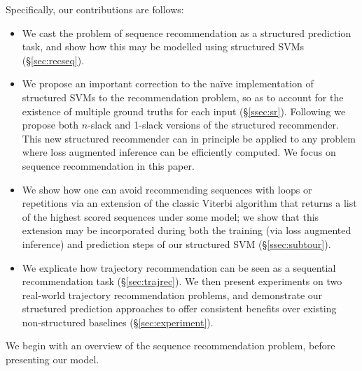 Specifically, our contributions are follows:
\begin{itemize}
	\item We cast the problem of sequence recommendation as a structured prediction task, and show how this may be modelled using structured SVMs (\S\ref{sec:recseq}).

	\item We propose an important correction to the na\"{i}ve implementation of structured SVMs to the recommendation problem, so as to account for the existence of multiple ground truths for each input (\S\ref{ssec:sr}). Following \citet{joachims2009cutting} we propose both $n$-slack and 1-slack versions of the structured recommender. This new structured recommender can in principle be applied to any problem where loss augmented inference can be efficiently computed. We focus on sequence recommendation in this paper.

	\item We show how one can avoid recommending sequences with loops or repetitions via an extension of the classic Viterbi algorithm that returns a list of the highest scored sequences under some model; we show that this extension may be incorporated during both the training (via loss augmented inference) and prediction steps of our structured SVM (\S\ref{ssec:subtour}).

	\item We explicate how trajectory recommendation can be seen as a sequential recommendation task (\S\ref{sec:trajrec}). We then present experiments on two real-world trajectory recommendation problems, and demonstrate our structured prediction approaches to offer consistent benefits over existing non-structured baselines (\S\ref{sec:experiment}).
\end{itemize}

We begin with an overview of the sequence recommendation problem, before presenting our model.
